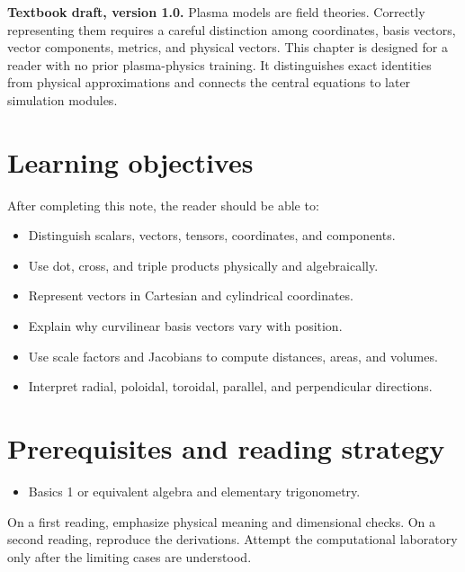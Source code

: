 \documentclass[11pt]{article}
\begin{document}

\begin{overviewbox}
\textbf{Textbook draft, version 1.0.} Plasma models are field theories. Correctly representing them requires a careful distinction among coordinates, basis vectors, vector components, metrics, and physical vectors. This chapter is designed for a reader with no prior plasma-physics training. It distinguishes exact identities from physical approximations and connects the central equations to later simulation modules.
\end{overviewbox}

\ProjectTOC

\section{Learning objectives}
After completing this note, the reader should be able to:
\begin{itemize}[leftmargin=1.6em]
\item Distinguish scalars, vectors, tensors, coordinates, and components.
\item Use dot, cross, and triple products physically and algebraically.
\item Represent vectors in Cartesian and cylindrical coordinates.
\item Explain why curvilinear basis vectors vary with position.
\item Use scale factors and Jacobians to compute distances, areas, and volumes.
\item Interpret radial, poloidal, toroidal, parallel, and perpendicular directions.
\end{itemize}

\section{Prerequisites and reading strategy}
\begin{itemize}[leftmargin=1.6em]
\item Basics 1 or equivalent algebra and elementary trigonometry.
\end{itemize}
On a first reading, emphasize physical meaning and dimensional checks. On a second reading, reproduce the derivations. Attempt the computational laboratory only after the limiting cases are understood.
\end{document}
